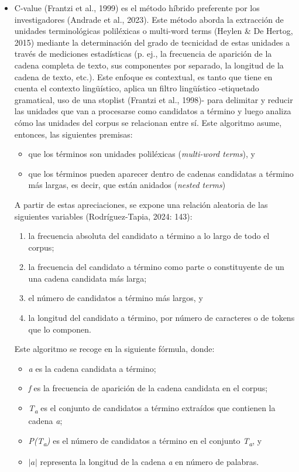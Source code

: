 \begin{itemize}
    \item C-value (Frantzi et al., 1999) es el método híbrido preferente por los investigadores (Andrade et al., 2023). Este método aborda la extracción de unidades terminológicas poliléxicas o multi-word terms (Heylen \& De Hertog, 2015) mediante la determinación del grado de tecnicidad de estas unidades a través de mediciones estadísticas (p. ej., la frecuencia de aparición de la cadena completa de texto, sus componentes por separado, la longitud de la cadena de texto, etc.). Este enfoque es contextual, es tanto que tiene en cuenta el contexto lingüístico, aplica un filtro lingüístico -etiquetado gramatical, uso de una stoplist (Frantzi et al., 1998)- para delimitar y reducir las unidades que van a procesarse como candidatos a término y luego analiza cómo las unidades del corpus se relacionan entre sí. Este algoritmo asume, entonces, las siguientes premisas:
    \begin{itemize}
        \item que los términos son unidades poliléxicas (\emph{multi-word terms}), y
        \item que los términos pueden aparecer dentro de cadenas candidatas a término más largas, es decir, que están anidados (\emph{nested terms})
    \end{itemize}

A partir de estas apreciaciones, se expone una relación aleatoria de las siguientes variables (Rodríguez-Tapia, 2024: 143):

\begin{enumerate}
    \item la frecuencia absoluta del candidato a término a lo largo de todo el corpus;
    \item la frecuencia del candidato a término como parte o constituyente de un una cadena candidata más larga;
    \item el número de candidatos a término más largos, y
    \item la longitud del candidato a término, por número de caracteres o de tokens que lo componen.
\end{enumerate}

Este algoritmo se recoge en la siguiente fórmula, donde:

\begin{itemize}
    \item \emph{a} es la cadena candidata a término;
    \item \emph{f} es la frecuencia de aparición de la cadena candidata en el corpus;
    \item \emph{T\textsubscript{a}} es el conjunto de candidatos a término extraídos que contienen la cadena \emph{a};
    \item \emph{P(T\textsubscript{a})} es el número de candidatos a término en el conjunto \emph{T\textsubscript{a}}, y
    \item $|a|$ representa la longitud de la cadena \emph{a} en número de palabras.
\end{itemize}


\end{itemize}
